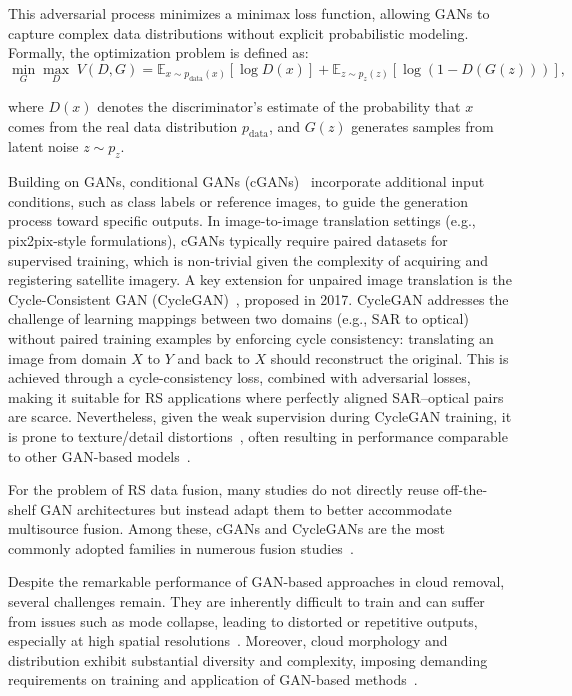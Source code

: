 This adversarial process minimizes a minimax loss function, allowing GANs to capture complex data distributions without explicit probabilistic modeling. Formally, the optimization problem is defined as:
\begin{equation}
\min_{G} \max_{D} \; V(D,G) = \mathbb{E}_{x \sim p_{\text{data}}(x)}[\log D(x)] 
+ \mathbb{E}_{z \sim p_{z}(z)}[\log (1 - D(G(z)))] ,
\end{equation}

where $D(x)$ denotes the discriminator’s estimate of the probability that $x$ comes from the real data distribution $p_{\text{data}}$, and $G(z)$ generates samples from latent noise $z \sim p_z$.

Building on GANs, conditional GANs (cGANs)~\cite{cGANs_mirza} incorporate additional input conditions, such as class labels or reference images, to guide the generation process toward specific outputs. In image-to-image translation settings (e.g., pix2pix-style formulations), cGANs typically require paired datasets for supervised training, which is non-trivial given the complexity of acquiring and registering satellite imagery. A key extension for unpaired image translation is the Cycle-Consistent GAN (CycleGAN)~\cite{cycle_GANs}, proposed in 2017. CycleGAN addresses the challenge of learning mappings between two domains (e.g., SAR to optical) without paired training examples by enforcing cycle consistency: translating an image from domain $X$ to $Y$ and back to $X$ should reconstruct the original. This is achieved through a cycle-consistency loss, combined with adversarial losses, making it suitable for RS applications where perfectly aligned SAR–optical pairs are scarce. Nevertheless, given the weak supervision during CycleGAN training, it is prone to texture/detail distortions~\cite{RS_Data_Fusion_GANs_sota}, often resulting in performance comparable to other GAN-based models~\cite{assessing_MT_cGANS_s2o_crop}.

For the problem of RS data fusion, many studies do not directly reuse off-the-shelf GAN architectures but instead adapt them to better accommodate multisource fusion. Among these, cGANs and CycleGANs are the most commonly adopted families in numerous fusion studies~\cite{RS_Data_Fusion_GANs_sota}.

Despite the remarkable performance of GAN-based approaches in cloud removal, several challenges remain. They are inherently difficult to train and can suffer from issues such as mode collapse, leading to distorted or repetitive outputs, especially at high spatial resolutions~\cite{GAN_gen_synt_MS}. Moreover, cloud morphology and distribution exhibit substantial diversity and complexity, imposing demanding requirements on training and application of GAN-based methods~\cite{DiffCR, CR_Advances_Review_ORS}.


